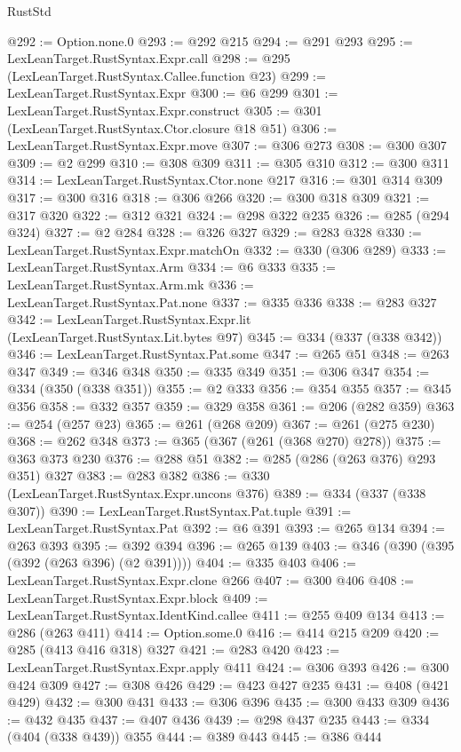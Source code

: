 \begin{lexlean}{RustStd}
\begin{coremodule}
@292 := Option.none.{0}
@293 := @292 @215
@294 := @291 @293
@295 := LexLeanTarget.RustSyntax.Expr.call
@298 := @295 (LexLeanTarget.RustSyntax.Callee.function @23)
@299 := LexLeanTarget.RustSyntax.Expr
@300 := @6 @299
@301 := LexLeanTarget.RustSyntax.Expr.construct
@305 := @301 (LexLeanTarget.RustSyntax.Ctor.closure @18 @51)
@306 := LexLeanTarget.RustSyntax.Expr.move
@307 := @306 @273
@308 := @300 @307
@309 := @2 @299
@310 := @308 @309
@311 := @305 @310
@312 := @300 @311
@314 := LexLeanTarget.RustSyntax.Ctor.none @217
@316 := @301 @314 @309
@317 := @300 @316
@318 := @306 @266
@320 := @300 @318 @309
@321 := @317 @320
@322 := @312 @321
@324 := @298 @322 @235
@326 := @285 (@294 @324)
@327 := @2 @284
@328 := @326 @327
@329 := @283 @328
@330 := LexLeanTarget.RustSyntax.Expr.matchOn
@332 := @330 (@306 @289)
@333 := LexLeanTarget.RustSyntax.Arm
@334 := @6 @333
@335 := LexLeanTarget.RustSyntax.Arm.mk
@336 := LexLeanTarget.RustSyntax.Pat.none
@337 := @335 @336
@338 := @283 @327
@342 := LexLeanTarget.RustSyntax.Expr.lit (LexLeanTarget.RustSyntax.Lit.bytes @97)
@345 := @334 (@337 (@338 @342))
@346 := LexLeanTarget.RustSyntax.Pat.some
@347 := @265 @51
@348 := @263 @347
@349 := @346 @348
@350 := @335 @349
@351 := @306 @347
@354 := @334 (@350 (@338 @351))
@355 := @2 @333
@356 := @354 @355
@357 := @345 @356
@358 := @332 @357
@359 := @329 @358
@361 := @206 (@282 @359)
@363 := @254 (@257 @23)
@365 := @261 (@268 @209)
@367 := @261 (@275 @230)
@368 := @262 @348
@373 := @365 (@367 (@261 (@368 @270) @278))
@375 := @363 @373 @230
@376 := @288 @51
@382 := @285 (@286 (@263 @376) @293 @351) @327
@383 := @283 @382
@386 := @330 (LexLeanTarget.RustSyntax.Expr.uncons @376)
@389 := @334 (@337 (@338 @307))
@390 := LexLeanTarget.RustSyntax.Pat.tuple
@391 := LexLeanTarget.RustSyntax.Pat
@392 := @6 @391
@393 := @265 @134
@394 := @263 @393
@395 := @392 @394
@396 := @265 @139
@403 := @346 (@390 (@395 (@392 (@263 @396) (@2 @391))))
@404 := @335 @403
@406 := LexLeanTarget.RustSyntax.Expr.clone @266
@407 := @300 @406
@408 := LexLeanTarget.RustSyntax.Expr.block
@409 := LexLeanTarget.RustSyntax.IdentKind.callee
@411 := @255 @409 @134
@413 := @286 (@263 @411)
@414 := Option.some.{0}
@416 := @414 @215 @209
@420 := @285 (@413 @416 @318) @327
@421 := @283 @420
@423 := LexLeanTarget.RustSyntax.Expr.apply @411
@424 := @306 @393
@426 := @300 @424 @309
@427 := @308 @426
@429 := @423 @427 @235
@431 := @408 (@421 @429)
@432 := @300 @431
@433 := @306 @396
@435 := @300 @433 @309
@436 := @432 @435
@437 := @407 @436
@439 := @298 @437 @235
@443 := @334 (@404 (@338 @439)) @355
@444 := @389 @443
@445 := @386 @444

\end{coremodule}
\end{lexlean}
